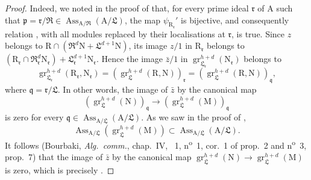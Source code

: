 \begin{proof}
Indeed, we noted in the proof of  that, for every prime ideal $\mathfrak{r}$ of $\mathrm{A}$ such that $\mathfrak{p}=\mathfrak{r}/\mathfrak{R}\in\operatorname{Ass}_{\mathrm{A}/\mathfrak{R}}(\mathrm{A}/\mathfrak{L})$, the map $\psi_{\mathrm{R}_\mathfrak{r}}'$ is bijective, and consequently relation , with all modules replaced by their localisations at $\mathfrak{r}$, is true. Since $z$ belongs to $\mathrm{R}\cap(\mathfrak{R}^d\mathrm{N}+\mathfrak{L}^{d+1}\mathrm{N})$, its image $z/1$ in $\mathrm{R}_\mathfrak{r}$ belongs to $(\mathrm{R}_\mathfrak{r}\cap\mathfrak{R}_\mathfrak{r}^d\mathrm{N}_\mathfrak{r})+\mathfrak{L}_\mathfrak{r}^{d+1}\mathrm{N}_\mathfrak{r}$. Hence the image $\bar{z}/1$ in $\operatorname{gr}_{\mathfrak{L}_\mathfrak{r}}^{h+d}(\mathrm{N}_\mathfrak{r})$ belongs to
\[
  \operatorname{gr}_{\mathfrak{L}_\mathfrak{r}}^{h+d}(\mathrm{R}_\mathfrak{r},\mathrm{N}_\mathfrak{r})
  =(\operatorname{gr}_\mathfrak{L}^{h+d}(\mathrm{R},\mathrm{N}))_\mathfrak{r}
  =(\operatorname{gr}_\mathfrak{L}^{h+d}(\mathrm{R},\mathrm{N}))_\mathfrak{q},
\]
where $\mathfrak{q}=\mathfrak{r}/\mathfrak{L}$. In other words, the image of $\bar{z}$ by the canonical map
\[
  (\operatorname{gr}_\mathfrak{L}^{h+d}(\mathrm{N}))_\mathfrak{q}
  \longrightarrow
  (\operatorname{gr}_\mathfrak{L}^{h+d}(\mathrm{M}))_\mathfrak{q}
\]
is zero for every $\mathfrak{q}\in\operatorname{Ass}_{\mathrm{A}/\mathfrak{L}}(\mathrm{A}/\mathfrak{L})$. As we saw in the proof of ,
\[
  \operatorname{Ass}_{\mathrm{A}/\mathfrak{L}}(\operatorname{gr}_\mathfrak{L}^{h+d}(\mathrm{M}))\subset\operatorname{Ass}_{\mathrm{A}/\mathfrak{L}}(\mathrm{A}/\mathfrak{L}).
\]
It follows (Bourbaki, \emph{Alg.~comm.}, chap.~IV, \textsection~1, n\textsuperscript{o}~1, cor.~1 of prop.~2 and n\textsuperscript{o}~3, prop.~7) that the image of $\bar{z}$ by the canonical map $\operatorname{gr}_\mathfrak{L}^{h+d}(\mathrm{N})\to\operatorname{gr}_\mathfrak{L}^{h+d}(\mathrm{M})$ is zero, which is precisely .


\end{proof}
